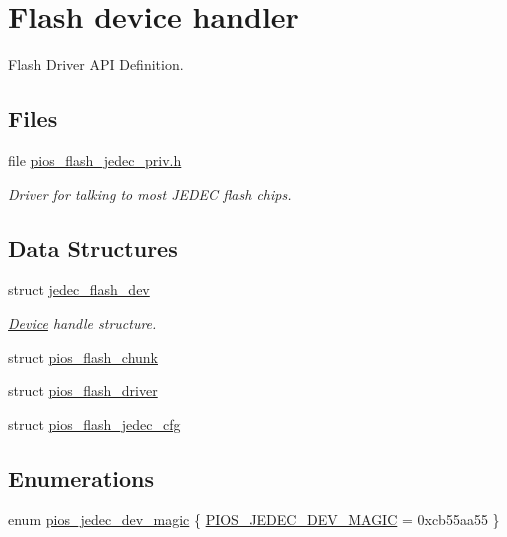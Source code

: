 \hypertarget{group___p_i_o_s___f_l_a_s_h}{\section{Flash device handler}
\label{group___p_i_o_s___f_l_a_s_h}
}


Flash Driver A\-P\-I Definition.  


\subsection*{Files}
\begin{DoxyCompactItemize}
\item 
file \hyperlink{pios__flash__jedec__priv_8h}{pios\-\_\-flash\-\_\-jedec\-\_\-priv.\-h}
\begin{DoxyCompactList}\small\item\em Driver for talking to most J\-E\-D\-E\-C flash chips. \end{DoxyCompactList}\end{DoxyCompactItemize}
\subsection*{Data Structures}
\begin{DoxyCompactItemize}
\item 
struct \hyperlink{structjedec__flash__dev}{jedec\-\_\-flash\-\_\-dev}
\begin{DoxyCompactList}\small\item\em \hyperlink{struct_device}{Device} handle structure. \end{DoxyCompactList}\item 
struct \hyperlink{structpios__flash__chunk}{pios\-\_\-flash\-\_\-chunk}
\item 
struct \hyperlink{structpios__flash__driver}{pios\-\_\-flash\-\_\-driver}
\item 
struct \hyperlink{structpios__flash__jedec__cfg}{pios\-\_\-flash\-\_\-jedec\-\_\-cfg}
\end{DoxyCompactItemize}
\subsection*{Enumerations}
\begin{DoxyCompactItemize}
\item 
enum \hyperlink{group___p_i_o_s___f_l_a_s_h_ga3e7c01370e9757b84f3a37ec903714f3}{pios\-\_\-jedec\-\_\-dev\-\_\-magic} \{ \hyperlink{group___p_i_o_s___f_l_a_s_h_gga3e7c01370e9757b84f3a37ec903714f3a6360375c9264a236124eccd65cf3e519}{P\-I\-O\-S\-\_\-\-J\-E\-D\-E\-C\-\_\-\-D\-E\-V\-\_\-\-M\-A\-G\-I\-C} = 0xcb55aa55
 \}
\end{DoxyCompactItemize}
